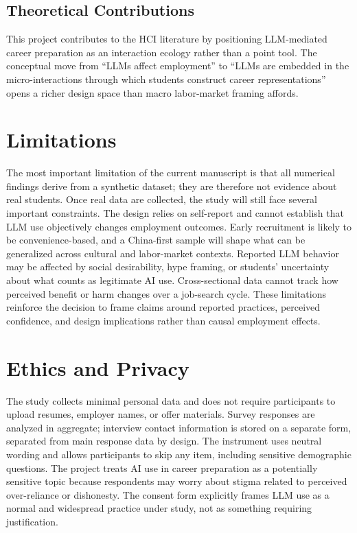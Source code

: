 \documentclass[sigconf,review,anonymous]{acmart}
\begin{document}
\subsection{Theoretical Contributions}

This project contributes to the HCI literature by positioning LLM-mediated
career preparation as an interaction ecology rather than a point tool.  The
conceptual move from ``LLMs affect employment'' to ``LLMs are embedded in
the micro-interactions through which students construct career
representations'' opens a richer design space than macro labor-market
framing affords.

\section{Limitations}

The most important limitation of the current manuscript is that all
numerical findings derive from a synthetic dataset; they are therefore not
evidence about real students.  Once real data are collected, the study will
still face several important constraints.  The design relies on self-report
and cannot establish that LLM use objectively changes employment outcomes.
Early recruitment is likely to be convenience-based, and a China-first
sample will shape what can be generalized across cultural and labor-market
contexts.  Reported LLM behavior may be affected by social desirability,
hype framing, or students' uncertainty about what counts as legitimate AI
use.  Cross-sectional data cannot track how perceived benefit or harm changes
over a job-search cycle.  These limitations reinforce the decision to frame
claims around reported practices, perceived confidence, and design
implications rather than causal employment effects.

\section{Ethics and Privacy}

The study collects minimal personal data and does not require participants
to upload resumes, employer names, or offer materials.  Survey responses are
analyzed in aggregate; interview contact information is stored on a separate
form, separated from main response data by design.  The instrument uses
neutral wording and allows participants to skip any item, including sensitive
demographic questions.  The project treats AI use in career preparation as a
potentially sensitive topic because respondents may worry about stigma
related to perceived over-reliance or dishonesty.  The consent form
explicitly frames LLM use as a normal and widespread practice under study,
not as something requiring justification.
\end{document}
